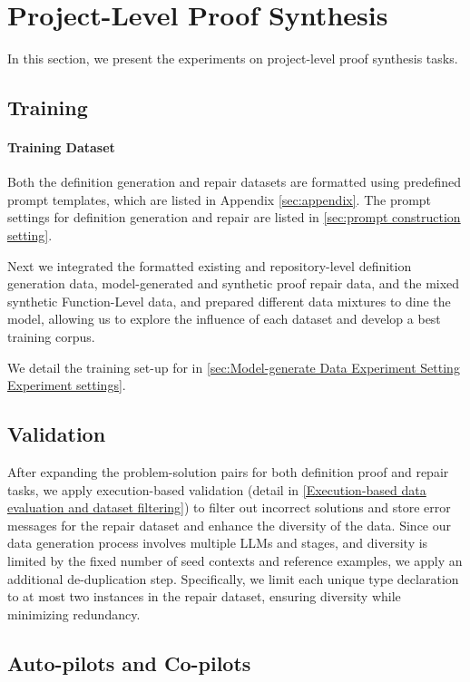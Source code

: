 \section{Project-Level Proof Synthesis}
In this section, we present the experiments on project-level proof synthesis tasks.
\subsection{Training}

\paragraph{Training Dataset}     
Both the definition generation and repair datasets are formatted using predefined prompt templates, which are listed in Appendix \ref{sec:appendix}. The prompt settings for definition generation and repair are listed in \ref{sec:prompt construction setting}.

Next we integrated the formatted existing and repository-level definition generation data, model-generated and synthetic proof repair data, and the mixed synthetic Function-Level data, and prepared different data mixtures to dine the model, allowing us to explore the influence of each dataset and develop a best training corpus. 

We detail the training set-up for \name in \ref{sec:Model-generate Data Experiment Setting Experiment settings}. 

\subsection{Validation}

After expanding the problem-solution pairs for both definition proof and repair tasks, we apply execution-based validation (detail in \ref{Execution-based data evaluation and dataset filtering}) to filter out incorrect solutions and store error messages for the repair dataset and enhance the diversity of the data. Since our data generation process involves multiple LLMs and stages, and diversity is limited by the fixed number of seed contexts and reference examples, we apply an additional de-duplication step. Specifically, we limit each unique type declaration to at most two instances in the repair dataset, ensuring diversity while minimizing redundancy.


\subsection{\name Auto-pilots and Co-pilots}

